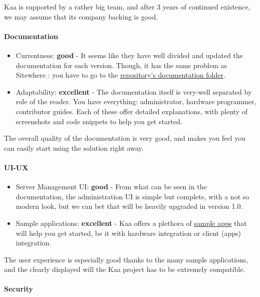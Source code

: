 \documentclass{article}
\begin{document}
Kaa is supported by a rather big team, and after 3 years of continued existence, we may assume that its company backing is good.

\paragraph{Documentation}

\begin{itemize}
\item Currentness: \textbf{good} - It seems like they have well divided and updated the documentation for each version. Though, it has the same problem as Sitewhere : you have to go to the \href{https://github.com/kaaproject/kaa/blob/master/doc/}{repository's documentation folder}.
\item Adaptability: \textbf{excellent} - The documentation itself is very-well separated by role of the reader. You have everything: administrator, hardware programmer, contributor guides. Each of these offer detailed explanations, with plenty of screenshots and code snippets to help you get started.
\end{itemize}

The overall quality of the documentation is very good, and makes you feel you can easily start using the solution right away.

\paragraph{UI-UX}

\begin{itemize}
\item Server Management UI: \textbf{good} - From what can be seen in the documentation, the administration UI is simple but complete, with a not so modern look, but we can bet that will be heavily upgraded in version 1.0.
\item Sample applications: \textbf{excellent} - Kaa offers a plethora of \href{https://github.com/kaaproject/sample-apps}{sample apps} that will help you get started, be it with hardware integration or client (apps) integration.
\end{itemize}

The user experience is especially good thanks to the many sample applications, and the clearly displayed will the Kaa project has to be extremely compatible.

\paragraph{Security} 
\end{document}

